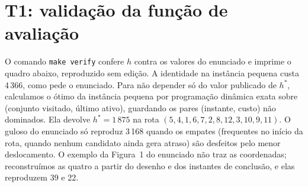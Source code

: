 \section{T1: validação da função de avaliação}
\label{sec:t1}

O comando \texttt{make verify} confere $h$ contra os valores do enunciado e imprime o quadro abaixo, reproduzido sem edição.
A identidade na instância pequena custa 4\,366, como pede o enunciado.
Para não depender só do valor publicado de $h^*$, calculamos o ótimo da instância pequena por programação dinâmica exata sobre (conjunto visitado, último ativo), guardando os pares (instante, custo) não dominados.
Ela devolve $h^* = 1\,875$ na rota $(5, 4, 1, 6, 7, 2, 8, 12, 3, 10, 9, 11)$.
O guloso do enunciado só reproduz 3\,168 quando os empates (frequentes no início da rota, quando nenhum candidato ainda gera atraso) são desfeitos pelo menor deslocamento.
O exemplo da Figura~1 do enunciado não traz as coordenadas; reconstruímos as quatro a partir do desenho e dos instantes de conclusão, e elas reproduzem 39 e 22.

{\small}

